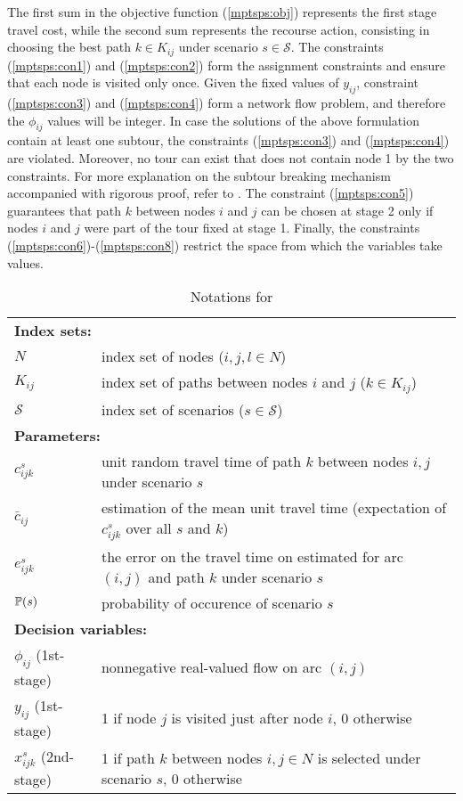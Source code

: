 The first sum in the objective function (\ref{mptsps:obj}) represents the first stage travel cost, while the second sum represents the recourse action, consisting in choosing the best path $k\in K_{ij}$ under scenario $s\in\mathcal{S}$. The constraints (\ref{mptsps:con1}) and (\ref{mptsps:con2}) form the assignment constraints and ensure that each node is visited only once. Given the fixed values of $y_{ij}$, constraint (\ref{mptsps:con3}) and (\ref{mptsps:con4}) form a network flow problem, and therefore the $\phi_{ij}$ values will be integer. In case the solutions of the above formulation contain at least one subtour, the constraints (\ref{mptsps:con3}) and (\ref{mptsps:con4}) are violated. Moreover, no tour can exist that does not contain node 1 by the two constraints. For more explanation on the subtour breaking mechanism accompanied with rigorous proof, refer to \cite{GG1978}. The constraint (\ref{mptsps:con5}) guarantees that path $k$ between nodes $i$ and $j$ can be chosen at stage 2 only if nodes $i$ and $j$ were part of the tour fixed at stage 1. Finally, the constraints (\ref{mptsps:con6})-(\ref{mptsps:con8}) restrict the space from which the variables take values.

\begin{table}[H]
	\caption{Notations for \mptsps}
	\label{mptsps:notation}
	\resizebox{\textwidth}{!}
	{
		\begin{tabular}{ll}
			\toprule
			\multicolumn{2}{l}{\textbf{Index sets:}} \\
			$N$ & \textrm{index set of nodes ($i,j,l\in N$)} \\ 
			$K_{ij}$ & \textrm{index set of paths between nodes $i$ and $j$ ($k\in K_{ij}$)} \\ 
			$\mathcal{S}$ & \textrm{index set of scenarios ($s\in \mathcal{S}$)}\\ \midrule
			\multicolumn{2}{l}{\textbf{Parameters:}} \\
			$c_{ijk}^{s}$ & \textrm{unit random travel time of path $k$ between nodes $i,j$ under scenario $s$} \\ 
			$\bar{c}_{ij}$ & \textrm{estimation of the mean unit travel time (expectation of $c_{ijk}^{s}$ over all $s$ and $k$)} \\ 
			$e_{ijk}^{s}$ & \textrm{the error on the travel time on estimated for arc $(i,j)$ and path $k$ under scenario $s$} \\ 
			$\operatorname*{\mathbb{P}}(s)$ & \textrm{probability of occurence of scenario $s$} \\  \midrule
			\multicolumn{2}{l}{\textbf{Decision variables:}} \\
			$\phi_{ij}$ (1st-stage) & \textrm{nonnegative real-valued flow on arc $(i,j)$}\\
			$y_{ij}$ (1st-stage)& \textrm{1 if node $j$ is visited just after node $i$, 0 otherwise} \\  
			$x_{ijk}^{s}$ (2nd-stage) & \textrm{1 if path $k$ between nodes $i,j\in N$ is selected under scenario $s$, 0 otherwise} \\ 
			\bottomrule
		\end{tabular}
	}
\end{table} 



